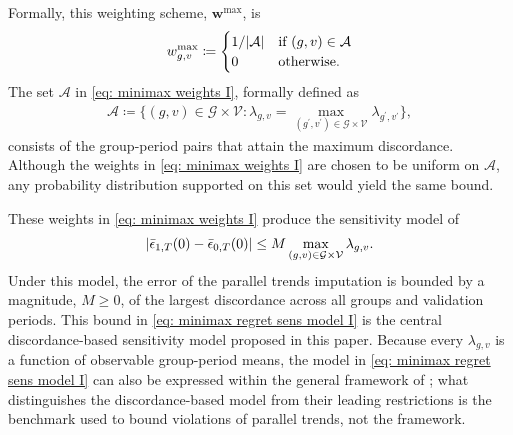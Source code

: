 \documentclass[twoside,11pt]{article}
\begin{document}
Formally, this weighting scheme, $\bm{w}^{\mathrm{max}}$, is 
\begin{equation} \label{eq: minimax weights I}
w^{\mathrm{max}}_{g,v} \coloneqq
\begin{cases}
1 / \lvert\mathcal{A}\rvert & \text{if } (g,v) \in \mathcal{A} \\
0 & \text{otherwise}.
\end{cases}
\end{equation}
The set $\mathcal{A}$ in \eqref{eq: minimax weights I}, formally defined as
\begin{align*}
\mathcal{A} \coloneqq \{(g, v) \in \mathcal{G} \times \mathcal{V}: \lambda_{g,v} = \max \limits_{(g^{\prime}, v^{\prime}) \in \mathcal{G} \times \mathcal{V}} \lambda_{g^{\prime}, v^{\prime}}\},
\end{align*}
consists of the group-period pairs that attain the maximum discordance. Although the weights in \eqref{eq: minimax weights I} are chosen to be uniform on $\mathcal{A}$, any probability distribution supported on this set would yield the same bound.

These weights in \eqref{eq: minimax weights I} produce the sensitivity model of
\begin{align} \label{eq: minimax regret sens model I}
\lvert\bar{\epsilon}_{1,T}(0) - \bar{\epsilon}_{0,T}(0)\rvert \leq M \max_{(g,v) \in \mathcal{G} \times \mathcal{V}} \lambda_{g,v}.
\end{align}
Under this model, the error of the parallel trends imputation is bounded by a magnitude, $M \geq 0$, of the largest discordance across all groups and validation periods. This bound in \eqref{eq: minimax regret sens model I} is the central discordance-based sensitivity model proposed in this paper. Because every $\lambda_{g,v}$ is a function of observable group-period means, the model in \eqref{eq: minimax regret sens model I} can also be expressed within the general framework of \citet{rambachanroth2023}; what distinguishes the discordance-based model from their leading restrictions is the benchmark used to bound violations of parallel trends, not the framework.
\end{document}
